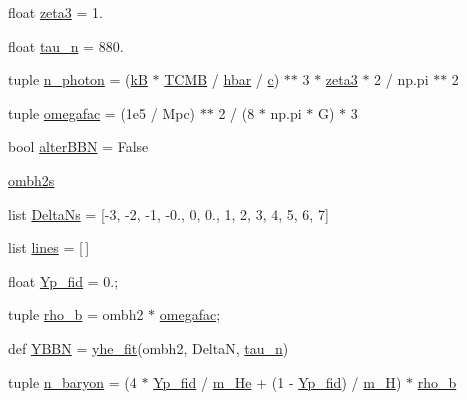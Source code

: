 \begin{DoxyCompactItemize}
\item 
float \mbox{\hyperlink{namespacecamb_1_1bbn_a484a30a2544ce82886fb2fe6860cc65c}{zeta3}} = 1.
\item 
float \mbox{\hyperlink{namespacecamb_1_1bbn_ae95abe1177100ca3b8cfb59cf9e379be}{tau\+\_\+n}} = 880.
\item 
tuple \mbox{\hyperlink{namespacecamb_1_1bbn_aa1b409ea1a7b5f583772b3f5cc174be0}{n\+\_\+photon}} = (\mbox{\hyperlink{namespacecamb_1_1bbn_acf1e58cf8bb0a963cdea5d6d5c8a7965}{kB}} $\ast$ \mbox{\hyperlink{namespacecamb_1_1bbn_ada23f3dc20ced1c849a9c6885f34db92}{T\+C\+MB}} / \mbox{\hyperlink{namespacecamb_1_1bbn_a5b708814b666163b312ae9d46c458a40}{hbar}} / \mbox{\hyperlink{namespacecamb_1_1bbn_a679cc6941c03606fb81846de0595bbf0}{c}}) $\ast$$\ast$ 3 $\ast$ \mbox{\hyperlink{namespacecamb_1_1bbn_a484a30a2544ce82886fb2fe6860cc65c}{zeta3}} $\ast$ 2 / np.\+pi $\ast$$\ast$ 2
\item 
tuple \mbox{\hyperlink{namespacecamb_1_1bbn_a9366441db17c0ca60e0fa48f8a8d796c}{omegafac}} = (1e5 / Mpc) $\ast$$\ast$ 2 / (8 $\ast$ np.\+pi $\ast$ G) $\ast$ 3
\item 
bool \mbox{\hyperlink{namespacecamb_1_1bbn_ae20f3b2b5c14d3eca9a605dae38f925c}{alter\+B\+BN}} = False
\item 
\mbox{\hyperlink{namespacecamb_1_1bbn_ac4e809a6c935e14eddb8e95f83b83c00}{ombh2s}}
\item 
list \mbox{\hyperlink{namespacecamb_1_1bbn_a2d30a7a9ec202c2f72d1fa5d58aa1cb5}{Delta\+Ns}} = \mbox{[}-\/3, -\/2, -\/1, -\/0., 0, 0., 1, 2, 3, 4, 5, 6, 7\mbox{]}
\item 
list \mbox{\hyperlink{namespacecamb_1_1bbn_a195010e01b08cf509c7b7c8519ea47d9}{lines}} = \mbox{[}$\,$\mbox{]}
\item 
float \mbox{\hyperlink{namespacecamb_1_1bbn_ace4721f676cd3090adcf649ff5eb439d}{Yp\+\_\+fid}} = 0.;
\item 
tuple \mbox{\hyperlink{namespacecamb_1_1bbn_ab5c5cbf9f645a4f423e0b8fdaba3c869}{rho\+\_\+b}} = ombh2 $\ast$ \mbox{\hyperlink{namespacecamb_1_1bbn_a9366441db17c0ca60e0fa48f8a8d796c}{omegafac}};
\item 
def \mbox{\hyperlink{namespacecamb_1_1bbn_ab3d92f46f19b0025c2d5c6e26522b30c}{Y\+B\+BN}} = \mbox{\hyperlink{namespacecamb_1_1bbn_ab4f0838cbe3e4c575ff31eaec11126c7}{yhe\+\_\+fit}}(ombh2, DeltaN, \mbox{\hyperlink{namespacecamb_1_1bbn_ae95abe1177100ca3b8cfb59cf9e379be}{tau\+\_\+n}})
\item 
tuple \mbox{\hyperlink{namespacecamb_1_1bbn_a6c667fa779cc99916a01199319f7757f}{n\+\_\+baryon}} = (4 $\ast$ \mbox{\hyperlink{namespacecamb_1_1bbn_ace4721f676cd3090adcf649ff5eb439d}{Yp\+\_\+fid}} / \mbox{\hyperlink{namespacecamb_1_1bbn_addcae6f33c5419e66f9ae3006383c347}{m\+\_\+\+He}} + (1 -\/ \mbox{\hyperlink{namespacecamb_1_1bbn_ace4721f676cd3090adcf649ff5eb439d}{Yp\+\_\+fid}}) / \mbox{\hyperlink{namespacecamb_1_1bbn_aa3780f95e3d1ace78bfe399ae081a621}{m\+\_\+H}}) $\ast$ \mbox{\hyperlink{namespacecamb_1_1bbn_ab5c5cbf9f645a4f423e0b8fdaba3c869}{rho\+\_\+b}}
$$
\end{DoxyCompactItemize}
